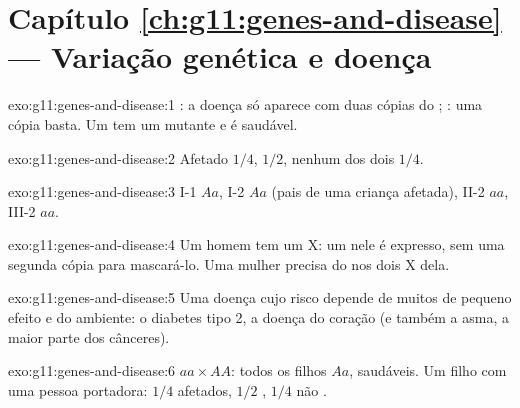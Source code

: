 \section*{Capítulo \ref{ch:g11:genes-and-disease} --- Variação genética e doença}

\begin{solution}{exo:g11:genes-and-disease:1}
: a doença só aparece com duas cópias do ; : uma
cópia basta. Um  tem um  mutante  e é saudável.
\end{solution}

\begin{solution}{exo:g11:genes-and-disease:2}
Afetado $1/4$,  $1/2$, nenhum dos dois $1/4$.
\end{solution}

\begin{solution}{exo:g11:genes-and-disease:3}
I-1 $Aa$, I-2 $Aa$ (pais de uma criança afetada), II-2 $aa$, III-2 $aa$.
\end{solution}

\begin{solution}{exo:g11:genes-and-disease:4}
Um homem tem um  X: um   nele é expresso, sem
uma segunda cópia para mascará-lo. Uma mulher precisa do  nos dois
 X dela.
\end{solution}

\begin{solution}{exo:g11:genes-and-disease:5}
Uma doença cujo risco depende de muitos  de pequeno efeito e do
ambiente: o diabetes tipo 2, a doença do coração (e também a asma, a
maior parte dos cânceres).
\end{solution}

\begin{solution}{exo:g11:genes-and-disease:6}
$aa \times AA$: todos os filhos $Aa$,  saudáveis. Um filho
 com uma pessoa portadora: $1/4$ afetados, $1/2$ ,
$1/4$ não .
\end{solution}

